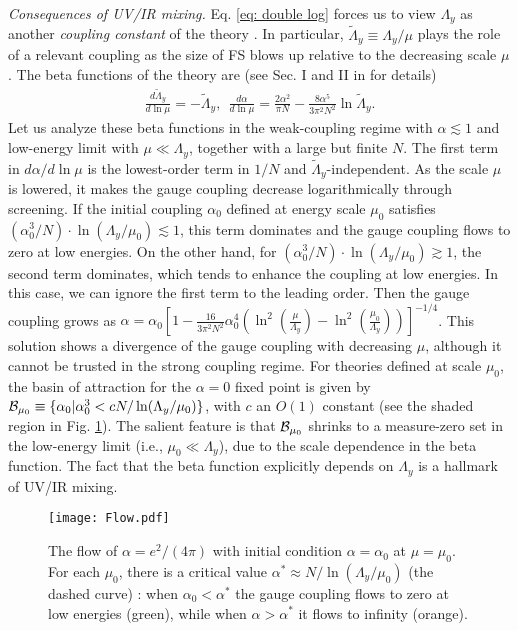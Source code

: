 \documentclass[prl,amsmath,amssymb, notitlepage, twocolumn,
nofootinbib,
superscriptaddress,
longbibliography
]{revtex4-1}
\newcommand{\beq}{\begin{eqnarray}}
\newcommand{\eeq}{\end{eqnarray}}
\newcommand{\ie}{{i.e., }}
\begin{document}
{{\it Consequences of UV/IR mixing.} Eq. \eqref{eq: double log} forces us to view $\Lambda_y$ as another 
{\it coupling constant} of the theory \cite{Mandal2015}. 
In particular, $\tilde \Lambda_y \equiv \Lambda_y/\mu$ plays the role of a relevant coupling as the size of FS blows up relative to the decreasing scale $\mu$.
The beta functions of the theory are (see Sec. I and II in \cite{supp} for details)
\beq\label{eq: Confusing RG term}
\frac{d \tilde \Lambda_y}{d \ln\mu} = - \tilde \Lambda_y,  ~~ 
\frac{d\alpha}{d \ln\mu} = 
\frac{2\alpha^2}{\pi N} -
\frac{8\alpha^5}{3\pi^2N^2} \ln\tilde \Lambda_y.
\eeq
Let us analyze these beta functions in the weak-coupling regime
with 
$\alpha \lesssim 1$ and low-energy limit
with $\mu\ll \Lambda_y$, together with
a large but finite $N$.
The first term 
in $d\alpha/d\ln \mu$
is the lowest-order term in $1/N$ and $\tilde \Lambda_y$-independent.
As the scale $\mu$ is lowered, 
it makes the 
gauge coupling decrease logarithmically through screening.
If the initial coupling $\alpha_0$ defined at energy scale $\mu_0$ satisfies $(\alpha_0^3/N)\cdot\ln  (\Lambda_y/\mu_0) \lesssim 1$, this term dominates and
the gauge coupling flows to zero at low energies.
On the other hand, 
for $(\alpha_0^3/N)\cdot\ln (\Lambda_y/\mu_0) \gtrsim 1$,
the second term dominates, 
which tends to enhance the coupling at low energies.
In this case,
we can ignore the first term to the leading order.
Then
the gauge coupling grows as $\alpha = \alpha_0\left[1-\frac{16}{3\pi^2 N^2}\alpha_0^4\left( \ln^2\left(\frac{\mu}{\Lambda_y}\right)-\ln^2\left(\frac{\mu_0}{\Lambda_y}\right)\right)\right]^{-1/4}$.
This solution shows a divergence of the gauge coupling with decreasing $\mu$, although it cannot be trusted in the strong coupling regime.
For theories defined at scale $\mu_0$,
the basin of attraction for the $\alpha=0$ fixed point  
is given by
$
{\cal B}_{\mu_0}
\equiv
\{
\alpha_0 | \alpha_0^3 < c N/ \ln (\Lambda_y/\mu_0) 
\}$,
with $c$ an $O(1)$ constant (see the shaded region in Fig. \ref{fig: Flow}).
The salient feature is that 
${\cal B}_{\mu_0}$
shrinks to a measure-zero set   in the low-energy limit 
(\ie $\mu_0\ll\Lambda_y$), due to the scale dependence in the beta function.
The fact that the beta function explicitly depends on $\Lambda_y$ is a hallmark of UV/IR mixing.

\begin{figure}[h]
\centering
\texttt{[image: Flow.pdf]}
\caption{
The flow of $\alpha=e^2/(4\pi)$ with initial condition $\alpha=\alpha_0$ at $\mu=\mu_0$. For each $\mu_0$, there is a critical value $\alpha^*\approx N/ \ln (\Lambda_y/\mu_0)$ (the dashed curve) :
 when $\alpha_0<\alpha^*$ the gauge coupling flows to zero at low energies (green), while when $\alpha>\alpha^*$ it flows to infinity (orange).}
\label{fig: Flow}
\end{figure}


}
\end{document}
